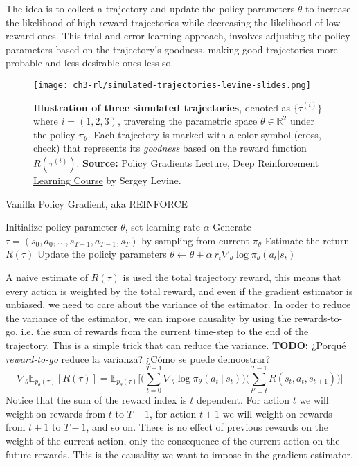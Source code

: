 The idea is to collect a trajectory and update the policy parameters $\theta$ to increase the likelihood of high-reward trajectories while decreasing the likelihood of low-reward ones. This trial-and-error learning approach, involves adjusting the policy parameters based on the trajectory's goodness, making good trajectories more probable and less desirable ones less so.
\begin{figure}[ht]
    \centering
    \texttt{[image: ch3-rl/simulated-trajectories-levine-slides.png]}
    \captionsetup{width=\textwidth} %
    \caption{\textbf{Illustration of three simulated trajectories}, denoted as $\{\tau^{(i)}\}$ where $i=(1,2,3)$, traversing the parametric space $\theta\in\mathbb{R}^2$ under the policy $\pi_{\theta}$. Each trajectory is marked with a color symbol (cross, check) that represents its \textit{goodness} based on the reward function $R(\tau^{(i)})$. \textbf{Source:} \href{https://rail.eecs.berkeley.edu/deeprlcourse/}{Policy Gradients Lecture, Deep Reinforcement Learning Course} by Sergey Levine.}
    \label{fig:anatomy-rl-trajectories}
  \end{figure}

\begin{algorithm}
    \caption{Vanilla Policy Gradient, aka REINFORCE}
    \begin{algorithmic}
    \STATE Initialize policy parameter $\theta$, set learning rate $\alpha$
    \STATE Generate $\tau=(s_0, a_0, ..., s_{T-1}, a_{T-1}, s_{T})$ by sampling from current $\pi_{\theta}$
        \STATE Estimate the return $R(\tau)$
        \STATE Update the policiy parameters $\theta \leftarrow \theta + \alpha~r_{t}\nabla_{\theta}\log\pi_{\theta}(a_{t}|s_{t})$
    \ENDFOR
    \end{algorithmic}
\end{algorithm}
A naive estimate of $R(\tau)$ is used the total trajectory reward, this means
that every action is weighted by the total reward, and even if the gradient
estimator is unbiased, we need to care about the variance of the estimator.
In order to reduce the variance of the estimator, we can impose causality
by using the rewards-to-go, i.e. the sum of rewards from the current time-step
to the end of the trajectory. This is a simple trick that can reduce the variance. \textbf{TODO:} ¿Porqué \textit{reward-to-go} reduce la varianza? ¿Cómo se puede
demoostrar?
\begin{equation}\label{eqn:reinforce-gradient-reward-to-go}
    \nabla_{\theta}\mathbb{E}_{p_{\theta}(\tau)}[R(\tau)] = \mathbb{E}_{p_{\theta}(\tau)}\bigg[\bigg(\sum_{t=0}^{T-1} \nabla_{\theta}\log \pi_{\theta} (a_t~|~s_t)\bigg) \bigg(\sum_{t'=t}^{T-1}R(s_{t}, a_{t}, s_{t+1})\bigg)\bigg] 
\end{equation}
Notice that the sum of the reward index is $t$ dependent. For action $t$ we 
will weight on rewards from $t$ to $T-1$, for action $t+1$ we will weight on
rewards from $t+1$ to $T-1$, and so on. There is no effect of previous rewards
on the weight of the current action, only the consequence of the current action
on the future rewards. This is the causality we want to impose in the gradient
estimator.

